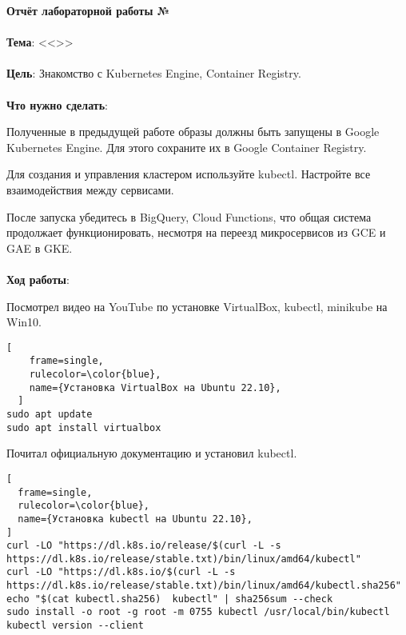 \documentclass[12pt, a4paper, simple]{eskdtext}
\begin{document}
  

  \begin{center}
    \textbf{Отчёт лабораторной работы №\envReportLabNumber}
  \end{center}

  \paragraph{} \textbf{Тема}: <<\envReportTitle>>

  \paragraph{} \textbf{Цель}:
  Знакомство с Kubernetes Engine, Container Registry.

  \paragraph{} \textbf{Что нужно сделать}:

  Полученные в предыдущей работе образы должны быть запущены в Google Kubernetes Engine.
  Для этого сохраните их в Google Container Registry.

  Для создания и управления кластером используйте kubectl.
  Настройте все взаимодействия между сервисами.

  После запуска убедитесь в BigQuery, Cloud Functions, что общая система продолжает функционировать,
  несмотря на переезд микросервисов из GCE и GAE в GKE.

  \paragraph{} \textbf{{Ход работы}}:

  Посмотрел видео на YouTube \cite{kubernetes_install} по установке VirtualBox, kubectl, minikube на Win10.

  \begin{lstlisting}[
    frame=single,
    rulecolor=\color{blue},
    name={Установка VirtualBox на Ubuntu 22.10},
  ]
sudo apt update
sudo apt install virtualbox
\end{lstlisting}

  Почитал официальную документацию \cite{kubernetes_install_kubectl} и установил kubectl.

\begin{lstlisting}[
  frame=single,
  rulecolor=\color{blue},
  name={Установка kubectl на Ubuntu 22.10},
]
curl -LO "https://dl.k8s.io/release/$(curl -L -s https://dl.k8s.io/release/stable.txt)/bin/linux/amd64/kubectl"
curl -LO "https://dl.k8s.io/$(curl -L -s https://dl.k8s.io/release/stable.txt)/bin/linux/amd64/kubectl.sha256"
echo "$(cat kubectl.sha256)  kubectl" | sha256sum --check
sudo install -o root -g root -m 0755 kubectl /usr/local/bin/kubectl
kubectl version --client
\end{lstlisting}
\end{document}
